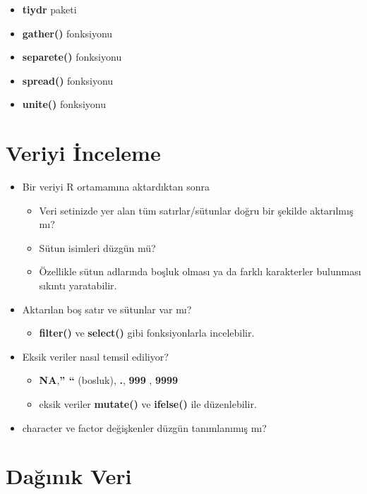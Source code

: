 \documentclass[
  oneside]{book}
\providecommand{\tightlist}{%
  \setlength{\itemsep}{0pt}\setlength{\parskip}{0pt}}
\begin{document}
\begin{itemize}
\tightlist
\item
  \textbf{tiydr} paketi
\item
  \textbf{gather()} fonksiyonu
\item
  \textbf{separete()} fonksiyonu
\item
  \textbf{spread()} fonksiyonu
\item
  \textbf{unite()} fonksiyonu
\end{itemize}

\hypertarget{veriyi-inceleme}{%
\section{Veriyi İnceleme}\label{veriyi-inceleme}}

\begin{itemize}
\item
  Bir veriyi R ortamamına aktardıktan sonra

  \begin{itemize}
  \item
    Veri setinizde yer alan tüm satırlar/sütunlar doğru bir şekilde aktarılmış mı?
  \item
    Sütun isimleri düzgün mü?
  \item
    Özellikle sütun adlarında boşluk olması ya da farklı karakterler bulunması sıkıntı yaratabilir.
  \end{itemize}
\item
  Aktarılan boş satır ve sütunlar var mı?

  \begin{itemize}
  \tightlist
  \item
    \textbf{filter()} ve \textbf{select()} gibi fonksiyonlarla incelebilir.
  \end{itemize}
\item
  Eksik veriler nasıl temsil ediliyor?

  \begin{itemize}
  \item
    \textbf{NA},\textbf{'' ``} (bosluk), \textbf{.}, \textbf{999} , \textbf{9999}
  \item
    eksik veriler \textbf{mutate()} ve \textbf{ifelse()} ile düzenlebilir.
  \end{itemize}
\item
  character ve factor değişkenler düzgün tanımlanımış mı?
\end{itemize}

\hypertarget{daux11fux131nux131k-veri}{%
\section{Dağınık Veri}\label{daux11fux131nux131k-veri}}
\end{document}
